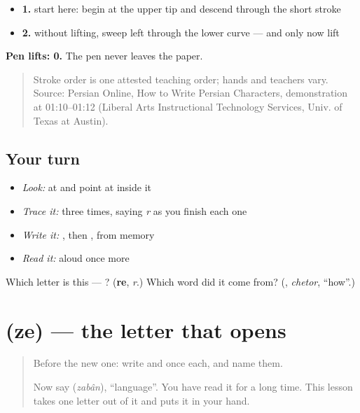 \begin{itemize}
\raggedright
  \item \textbf{1.} start here: begin at the upper tip and descend through the short stroke
  \item \textbf{2.} without lifting, sweep left through the lower curve — and only now lift
\end{itemize}

\textbf{Pen lifts: 0.} The pen never leaves the paper.

\begin{quote}
Stroke order is one attested teaching order; hands and teachers vary. Source: Persian Online, How to Write Persian Characters,  demonstration at 01:10–01:12 (Liberal Arts Instructional Technology Services, Univ. of Texas at Austin).
\end{quote}

\subsection*{Your turn}
\begin{itemize}
\raggedright
  \item \emph{Look:} at \textbf{} and point at  inside it
  \item \emph{Trace it:}  three times, saying \emph{r} as you finish each one
  \item \emph{Write it:} , then , from memory
  \item \emph{Read it:} \textbf{} aloud once more
\end{itemize}

\begin{tcolorbox}[breakable,colback=teal!4,colframe=teal!35!black,title={Before you move on}]
Which letter is this — ? (\textbf{re}, \emph{r}.) Which word did it come from? (\textbf{}, \emph{chetor}, \textquotedblleft{}how\textquotedblright{}.)
\end{tcolorbox}
\section[\texorpdfstring{\fa{ز} (ze)}{ز (ze)}]{ (ze) — the letter that opens }

\label{lesson:FA-W22-ze}



\begin{quote}
Before the new one: write  and  once each, and name them.

Now say \textbf{} (\emph{zabân}), \textquotedblleft{}language\textquotedblright{}. You have read it for a long time. This lesson takes one letter out of it and puts it in your hand.
\end{quote}

